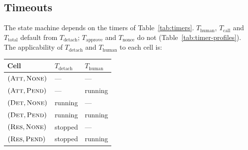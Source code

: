 \subsection{Timeouts}\label{sec:timeouts}

The state machine depends on the timers of Table~\ref{tab:timers}.
$T_{\text{human}}$, $T_{\text{call}}$ and $T_{\text{total}}$ default from
$T_{\text{detach}}$; $T_{\text{approve}}$ and $T_{\text{nonce}}$ do not
(Table~\ref{tab:timer-profiles}). The
applicability of $T_{\text{detach}}$ and $T_{\text{human}}$ to each cell
is:

\begin{center}
\small
\begin{tabular}{l l l}
\toprule
\textbf{Cell} & $T_{\text{detach}}$ & $T_{\text{human}}$ \\
\midrule
$(\textsc{Att},\textsc{None})$ & --- & --- \\
$(\textsc{Att},\textsc{Pend})$ & --- & running \\
$(\textsc{Det},\textsc{None})$ & running & --- \\
$(\textsc{Det},\textsc{Pend})$ & running & running \\
$(\textsc{Res},\textsc{None})$ & stopped & --- \\
$(\textsc{Res},\textsc{Pend})$ & stopped & running \\
\bottomrule
\end{tabular}
\end{center}

